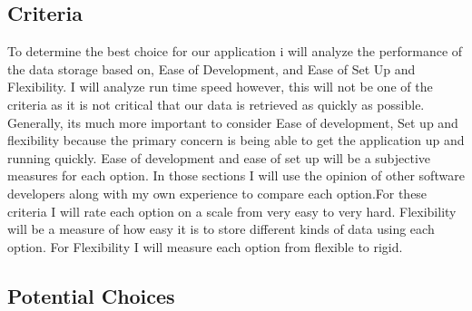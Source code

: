 \documentclass[onecolumn, draftclsnofoot,10pt, compsoc]{article}
\begin{document}
	\subsection{Criteria}
	 To determine the best choice for our application i will analyze the performance of the data storage based on, Ease of Development, and Ease of Set Up and Flexibility. I will analyze run time speed however, this will not be one of the criteria as it is not critical that our data is retrieved as quickly as possible. Generally, its much more important to consider Ease of development, Set up and flexibility because the primary concern is being able to get the application up and running quickly. Ease of development and ease of set up will be a subjective measures for each option. In those sections I will use the opinion of other software developers along with my own experience to compare each option.For these criteria I will rate each option on a scale from very easy to very hard. Flexibility will be a measure of how easy it is to store different kinds of data using each option. For Flexibility I will measure each option from flexible to rigid.\\
	\subsection{Potential Choices}
\end{document}
